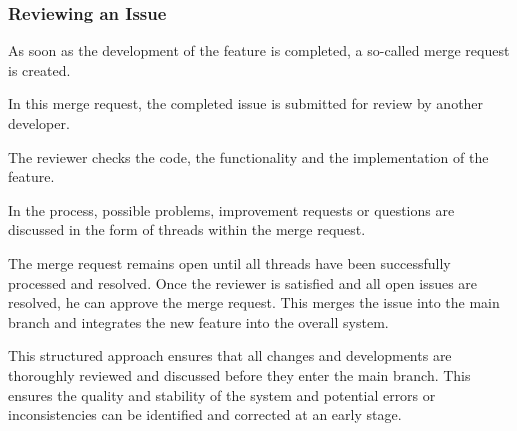 \documentclass[12pt]{article}
\begin{document}
\subsubsection{Reviewing an Issue}
\begin{minipage}[t]{0.51\textwidth}
As soon as the development of the feature is completed, a so-called merge request is created.

In this merge request, the completed issue is submitted for review by another developer. 

The reviewer checks the code, the functionality and the implementation of the feature. 

In the process, possible problems, improvement requests or questions are discussed in the form of threads within the merge request.

The merge request remains open until all threads have been successfully processed and resolved. Once the reviewer is satisfied and all open issues are resolved, he can approve the merge request. This merges the issue into the main branch and integrates the new feature into the overall system.

This structured approach ensures that all changes and developments are thoroughly reviewed and discussed before they enter the main branch. This ensures the quality and stability of the system and potential errors or inconsistencies can be identified and corrected at an early stage.


\end{minipage} 
\hfill
\end{document}

